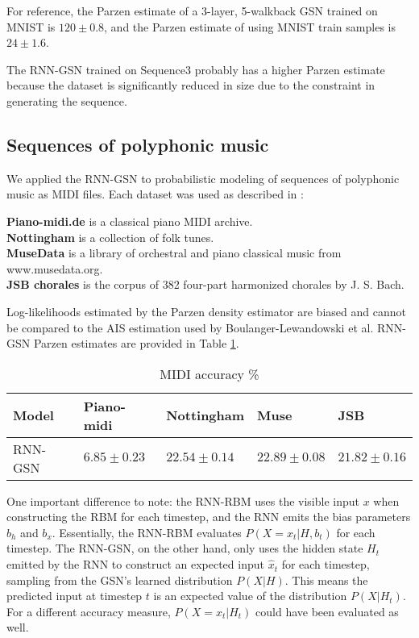 For reference, the Parzen estimate of a 3-layer, 5-walkback GSN trained on MNIST is $120 \pm 0.8$, and the Parzen estimate of using MNIST train samples is $24 \pm 1.6$.

The RNN-GSN trained on Sequence3 probably has a higher Parzen estimate because the dataset is significantly reduced in size due to the constraint in generating the sequence.

\subsection{Sequences of polyphonic music}
	We applied the RNN-GSN to probabilistic modeling of sequences of polyphonic music as MIDI files. Each dataset was used as described in \cite{rnnrbm}:

\textbf{Piano-midi.de} is a classical piano MIDI archive.\\
\textbf{Nottingham} is a collection of folk tunes.\\
\textbf{MuseData} is a library of orchestral and piano classical music from www.musedata.org.\\
\textbf{JSB chorales} is the corpus of 382 four-part harmonized chorales by J. S. Bach.
	
Log-likelihoods estimated by the Parzen density estimator are biased and cannot be compared to the AIS estimation used by Boulanger-Lewandowski et al. RNN-GSN Parzen estimates are provided in Table \ref{tab:parzen}.


\begin {table}[H]
 \caption {MIDI accuracy \%} \label{tab:parzen}
\begin{tabular}{l | l l l l}
\hline
Model & Piano-midi & Nottingham & Muse & JSB\\
\hline
RNN-GSN  & $6.85 \pm 0.23$ & $22.54 \pm 0.14$ & $22.89 \pm 0.08$ & $21.82 \pm 0.16$
\end{tabular}
\end{table}

One important difference to note: the RNN-RBM uses the visible input $x$ when constructing the RBM for each timestep, and the RNN emits the bias parameters $b_h$ and $b_x$. Essentially, the RNN-RBM evaluates $P(X=x_t|H,b_t)$ for each timestep.
The RNN-GSN, on the other hand, only uses the hidden state $H_t$ emitted by the RNN to construct an expected input $\hat{x}_t$ for each timestep, sampling from the GSN's learned distribution $P(X|H)$. This means the predicted input at timestep $t$ is an expected value of the distribution $P(X|H_t)$. For a different accuracy measure, $P(X=x_t|H_t)$ could have been evaluated as well.
